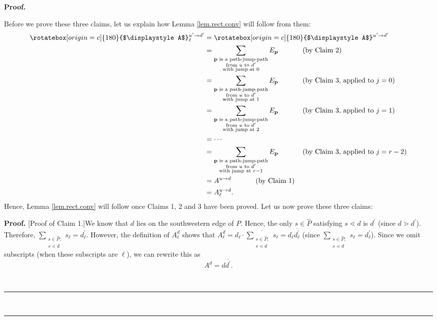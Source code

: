 \documentclass[numbers=enddot,12pt,final,onecolumn,notitlepage]{scrartcl}%
\theoremstyle{definition}
\newenvironment{statement}{\begin{quote}}{\end{quote}}
\newcommand{\upslack}{\mathchoice{\rotatebox[origin=c]{180}{$\displaystyle A$}}{\rotatebox[origin=c]{180}{$\textstyle A$}}{\rotatebox[origin=c]{180}{$\scriptstyle A$}}{\rotatebox[origin=c]{180}{$\scriptscriptstyle A$}}}
\newcommand{\downslack}{A}
\newenvironment{proof}[1][Proof]{\noindent\textbf{#1.} }{\ \rule{0.5em}{0.5em}}
\let\sumnonlimits\sum
\renewcommand{\sum}{\sumnonlimits\limits}
\begin{document}
\begin{proof}
\begin{statement}
\end{statement}

Before we prove these three claims, let us explain how Lemma
\ref{lem.rect.conv} will follow from them:%
\begin{align*}
\upslack_{\ell}^{u^{\prime}\rightarrow d^{\prime}}  &  =\upslack^{u^{\prime
}\rightarrow d^{\prime}}\\
&  =\sum_{\substack{\mathbf{p}\text{ is a path-jump-path}\\\text{from }u\text{
to }d^{\prime}\\\text{with jump at }0}}E_{\mathbf{p}}%
\ \ \ \ \ \ \ \ \ \ \left(  \text{by Claim 2}\right) \\
&  =\sum_{\substack{\mathbf{p}\text{ is a path-jump-path}\\\text{from }u\text{
to }d^{\prime}\\\text{with jump at }1}}E_{\mathbf{p}}%
\ \ \ \ \ \ \ \ \ \ \left(  \text{by Claim 3, applied to }j=0\right) \\
&  =\sum_{\substack{\mathbf{p}\text{ is a path-jump-path}\\\text{from }u\text{
to }d^{\prime}\\\text{with jump at }2}}E_{\mathbf{p}}%
\ \ \ \ \ \ \ \ \ \ \left(  \text{by Claim 3, applied to }j=1\right) \\
&  =\cdots\\
&  =\sum_{\substack{\mathbf{p}\text{ is a path-jump-path}\\\text{from }u\text{
to }d^{\prime}\\\text{with jump at }r-1}}E_{\mathbf{p}}%
\ \ \ \ \ \ \ \ \ \ \left(  \text{by Claim 3, applied to }j=r-2\right) \\
&  =\downslack^{u\rightarrow d}\ \ \ \ \ \ \ \ \ \ \left(  \text{by Claim
1}\right) \\
&  =\downslack_{\ell}^{u\rightarrow d}.
\end{align*}
Hence, Lemma \ref{lem.rect.conv} will follow once Claims 1, 2 and 3 have been
proved. Let us now prove these three claims: \medskip

\begin{proof}
[Proof of Claim 1.]We know that $d$ lies on the southwestern edge of $P$.
Hence, the only $s\in\widehat{P}$ satisfying $s\lessdot d$ is $d^{\prime}$
(since $d\gtrdot d^{\prime}$). Therefore, $\sum_{\substack{s\in\widehat{P}%
;\\s\lessdot d}}s_{\ell}=d_{\ell}^{\prime}$. However, the definition of
$\downslack_{\ell}^{d}$ shows that $\downslack_{\ell}^{d}=d_{\ell}%
\cdot\overline{\sum_{\substack{s\in\widehat{P};\\s\lessdot d}}s_{\ell}%
}=d_{\ell}\overline{d_{\ell}^{\prime}}$ (since $\sum_{\substack{s\in
\widehat{P};\\s\lessdot d}}s_{\ell}=d_{\ell}^{\prime}$). Since we omit
subscripts (when these subscripts are $\ell$), we can rewrite this as
\begin{equation}
\downslack^{d}=d\overline{d^{\prime}}. \label{pf.lem.rect.conv.c1.pf.1}%
\end{equation}



\end{proof}
\end{proof}
\end{document}
